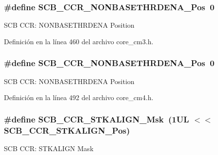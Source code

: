 \subsubsection[{\texorpdfstring{S\+C\+B\+\_\+\+C\+C\+R\+\_\+\+N\+O\+N\+B\+A\+S\+E\+T\+H\+R\+D\+E\+N\+A\+\_\+\+Pos}{SCB_CCR_NONBASETHRDENA_Pos}}]{\setlength{\rightskip}{0pt plus 5cm}\#define S\+C\+B\+\_\+\+C\+C\+R\+\_\+\+N\+O\+N\+B\+A\+S\+E\+T\+H\+R\+D\+E\+N\+A\+\_\+\+Pos~0}\hypertarget{group___c_m_s_i_s___s_c_b_gab4615f7deb07386350365b10240a3c83}{}\label{group___c_m_s_i_s___s_c_b_gab4615f7deb07386350365b10240a3c83}
S\+CB C\+CR\+: N\+O\+N\+B\+A\+S\+E\+T\+H\+R\+D\+E\+NA Position 

Definición en la línea 460 del archivo core\+\_\+cm3.\+h.

\subsubsection[{\texorpdfstring{S\+C\+B\+\_\+\+C\+C\+R\+\_\+\+N\+O\+N\+B\+A\+S\+E\+T\+H\+R\+D\+E\+N\+A\+\_\+\+Pos}{SCB_CCR_NONBASETHRDENA_Pos}}]{\setlength{\rightskip}{0pt plus 5cm}\#define S\+C\+B\+\_\+\+C\+C\+R\+\_\+\+N\+O\+N\+B\+A\+S\+E\+T\+H\+R\+D\+E\+N\+A\+\_\+\+Pos~0}\hypertarget{group___c_m_s_i_s___s_c_b_gab4615f7deb07386350365b10240a3c83}{}\label{group___c_m_s_i_s___s_c_b_gab4615f7deb07386350365b10240a3c83}
S\+CB C\+CR\+: N\+O\+N\+B\+A\+S\+E\+T\+H\+R\+D\+E\+NA Position 

Definición en la línea 492 del archivo core\+\_\+cm4.\+h.

\subsubsection[{\texorpdfstring{S\+C\+B\+\_\+\+C\+C\+R\+\_\+\+S\+T\+K\+A\+L\+I\+G\+N\+\_\+\+Msk}{SCB_CCR_STKALIGN_Msk}}]{\setlength{\rightskip}{0pt plus 5cm}\#define S\+C\+B\+\_\+\+C\+C\+R\+\_\+\+S\+T\+K\+A\+L\+I\+G\+N\+\_\+\+Msk~(1\+U\+L $<$$<$ S\+C\+B\+\_\+\+C\+C\+R\+\_\+\+S\+T\+K\+A\+L\+I\+G\+N\+\_\+\+Pos)}\hypertarget{group___c_m_s_i_s___s_c_b_ga33cf22d3d46af158a03aad25ddea1bcb}{}\label{group___c_m_s_i_s___s_c_b_ga33cf22d3d46af158a03aad25ddea1bcb}
S\+CB C\+CR\+: S\+T\+K\+A\+L\+I\+GN Mask 

